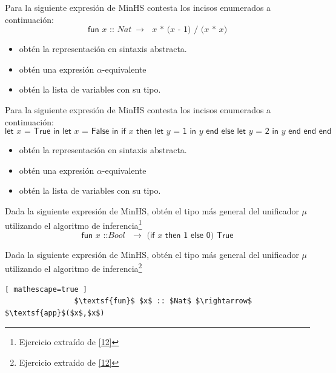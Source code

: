 \bigskip

	\begin{exercise}
		Para la siguiente expresión de \textsf{MinHS} contesta los incisos enumerados a continuación:
\bigskip
		\[
			\textsf{fun $x$ :: $Nat\ \rightarrow$ $x$ * ($x$ - 1) / ($x$ * $x$)}
		\]
\bigskip
		\begin{itemize}
			\item obtén la representación en sintaxis abstracta.
			\item obtén una expresión $\alpha$-equivalente
			\item obtén la lista de variables con su tipo.
		\end{itemize}
	\end{exercise}

\bigskip

	\begin{exercise}
		Para la siguiente expresión de \textsf{MinHS} contesta los incisos enumerados a continuación:
\bigskip
		\[
			\textsf{let $x$ = True in let $x$ = False in if $x$ then let $y$ = 1 in $y$  end else let $y$ = 2 in $y$ end end end}
		\]
		\begin{itemize}
			\item obtén la representación en sintaxis abstracta.
			\item obtén una expresión $\alpha$-equivalente
			\item obtén la lista de variables con su tipo.
		\end{itemize}
	\end{exercise}

\bigskip

    \begin{exercise} Dada la siguiente expresión de \textsf{MinHS}, obtén el tipo más general del unificador $\mu$ utilizando el algoritmo de inferencia\footnote{Ejercicio extraído de \hyperlink{12}{[12]}}
          \[
                \textsf{fun $x$ ::$Bool$ $\rightarrow$ (if $x$ then 1 else 0) True}
	\]
    \end{exercise}

\bigskip

    \begin{exercise} Dada la siguiente expresión de \textsf{MinHS}, obtén el tipo más general del unificador $\mu$ utilizando el algoritmo de inferencia\footnote{Ejercicio extraído de \hyperlink{12}{[12]}}
           \begin{lstlisting}[ mathescape=true ]
                $\textsf{fun}$ $x$ :: $Nat$ $\rightarrow$ $\textsf{app}$($x$,$x$)
           \end{lstlisting} 
    \end{exercise}

